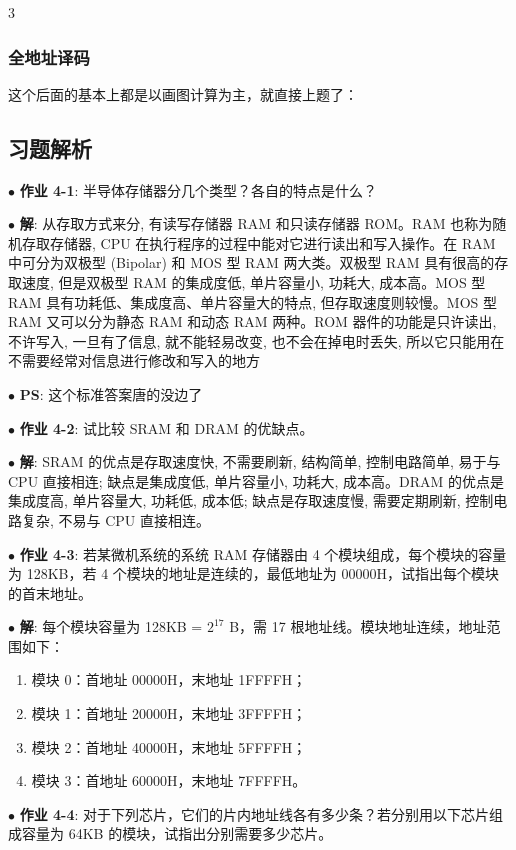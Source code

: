 \documentclass[10pt, a4paper, landscape]{article}
\newcommand{\green}[1]{\textbf{\textcolor{mygreen}{#1}}}
\newcommand{\entry}[2]{$\bullet$ \textbf{#1}: #2\par\vspace{0.5pt}}
\begin{document}
\begin{multicols*}{3}
\subsubsection{全地址译码}

这个后面的基本上都是以画图计算为主，就直接上题了：

\subsection{习题解析}

\entry{\green{作业 4-1}}{半导体存储器分几个类型？各自的特点是什么？}

\entry{解}{从存取方式来分, 有读写存储器 RAM 和只读存储器 ROM。RAM 也称为随机存取存储器, CPU 在执行程序的过程中能对它进行读出和写入操作。在 RAM 中可分为双极型 (Bipolar) 和 MOS 型 RAM 两大类。双极型 RAM 具有很高的存取速度, 但是双极型 RAM 的集成度低, 单片容量小, 功耗大, 成本高。MOS 型 RAM 具有功耗低、集成度高、单片容量大的特点, 但存取速度则较慢。MOS 型 RAM 又可以分为静态 RAM 和动态 RAM 两种。ROM 器件的功能是只许读出, 不许写入, 一旦有了信息, 就不能轻易改变, 也不会在掉电时丢失, 所以它只能用在不需要经常对信息进行修改和写入的地方}

\entry{PS}{这个标准答案唐的没边了}

\entry{\green{作业 4-2}}{试比较 SRAM 和 DRAM 的优缺点。}

\entry{解}{
    SRAM 的优点是存取速度快, 不需要刷新, 结构简单, 控制电路简单, 易于与 CPU 直接相连; 缺点是集成度低, 单片容量小, 功耗大, 成本高。DRAM 的优点是集成度高, 单片容量大, 功耗低, 成本低; 缺点是存取速度慢, 需要定期刷新, 控制电路复杂, 不易与 CPU 直接相连。
}

\entry{\green{作业 4-3}}{若某微机系统的系统 RAM 存储器由 4 个模块组成，每个模块的容量为 128KB，若 4 个模块的地址是连续的，最低地址为 00000H，试指出每个模块的首末地址。}

\entry{解}{
    每个模块容量为 128KB = $2^{17}$ B，需 17 根地址线。模块地址连续，地址范围如下：
    \begin{enumerate}
        \item 模块 0：首地址 00000H，末地址 1FFFFH；
        \item 模块 1：首地址 20000H，末地址 3FFFFH；
        \item 模块 2：首地址 40000H，末地址 5FFFFH；
        \item 模块 3：首地址 60000H，末地址 7FFFFH。
    \end{enumerate}
}

\entry{\green{作业 4-4}}{对于下列芯片，它们的片内地址线各有多少条？若分别用以下芯片组成容量为 64KB 的模块，试指出分别需要多少芯片。}


\end{multicols*}
\end{document}

